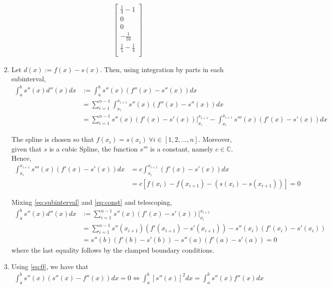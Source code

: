 \documentclass{article}
\begin{document}
\begin{enumerate}[label=(\roman*)]
\begin{align}
\begin{bmatrix}
                \frac{1}{4} - 1 \\
                0 \\
                0 \\
                -\frac{1}{16} \\
                \frac{1}{5}-\frac{1}{4} \\
            \end{bmatrix}
        \end{align}
        \item Let $d(x):=f(x)-s(x)$. Then, using integration by parts in each subinterval,
        \begin{align}
            \int_a^b s''(x)d''(x)dx&:=\int_a^b s''(x)(f''(x) - s''(x))dx\\
            &=\sum_{i=1}^{n-1}\int_{x_i}^{x_{i+1}} s''(x)(f''(x) - s''(x))dx \\
            &=\sum_{i=1}^{n-1} s''(x)(f'(x)-s'(x))\bigg\rvert_{x_i}^{x_{i+1}} - \int_{x_i}^{x_{i+1}}  s'''(x)(f'(x) - s'(x))dx
            \label{eq:subinterval}
        \end{align}
        
        The spline is chosen so that $f(x_i)=s(x_i) \ \forall i\in [1,2,\dots, n]$. Moreover, given that $s$ is a cubic Spline, the function $s'''$ is a constant, namely $c\in \mathbb{C}$. Hence, 
        \begin{align}
            \int_{x_i}^{x_{i+1}}  s'''(x)(f'(x) - s'(x))dx &= c \int_{x_i}^{x_{i+1}}(f'(x) - s'(x))dx \\
            &= c[f(x_i)-f(x_{i+1})-(s(x_i)-s(x_{i+1}))]=0
            \label{eq:const}
        \end{align}
        
        Mixing \eqref{eq:subinterval} and \eqref{eq:const} and telescoping,
        \begin{align}
            \int_a^b s''(x)d''(x)dx&:=\sum_{i=1}^{n-1} s''(x)(f'(x)-s'(x))\bigg\rvert_{x_i}^{x_{i+1}} \\
            &= \sum_{i=1}^{n-1} s''(x_{i+1})(f'(x_{i+1})-s'(x_{i+1})) - s''(x_{i})(f'(x_{i})-s'(x_i)) \\
            &=s''(b)(f'(b)-s'(b)) - s''(a)(f'(a)-s'(a)) =0
            \label{eq:0}
        \end{align}
        where the last equality follows by the clamped boundary conditions.
        
        \item Using \eqref{eq:0}, we have that
        \begin{align}
            \int_a^b s''(x)(s''(x) - f''(x)) dx = 0 \Longleftrightarrow \int_a^b [s''(x)]^2dx = \int_a^b s''(x) f''(x) dx
            \label{eq:equality}
        \end{align}
        

\end{enumerate}
\end{document}
